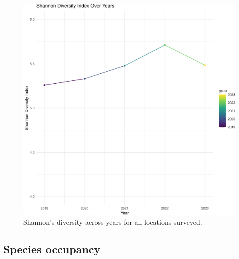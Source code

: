 \documentclass[
  letterpaper,
  DIV=11,
  numbers=noendperiod,
  oneside]{scrartcl}
\begin{document}
\begin{figure}

{\centering \includegraphics{peinp_files/figure-pdf/fig-shannon-1.pdf}

}

\caption{\label{fig-shannon}Shannon's diversity across years for all
locations surveyed.}

\end{figure}

\hypertarget{species-occupancy}{%
\subsection{Species occupancy}\label{species-occupancy}}
\end{document}
